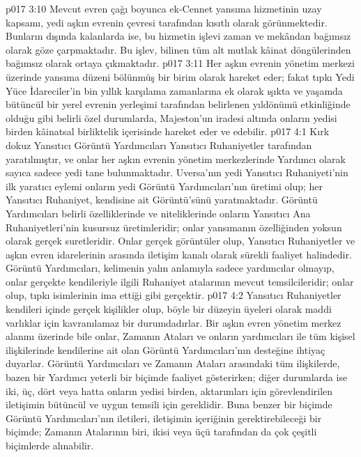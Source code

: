 \vs p017 3:10 Mevcut evren çağı boyunca ek\hyp{}Cennet yansıma hizmetinin uzay kapsamı, yedi aşkın evrenin çevresi tarafından kısıtlı olarak görünmektedir. Bunların dışında kalanlarda ise, bu hizmetin işlevi zaman ve mekândan bağımsız olarak göze çarpmaktadır. Bu işlev, bilinen tüm alt mutlak kâinat döngülerinden bağımsız olarak ortaya çıkmaktadır.
\vs p017 3:11 Her aşkın evrenin yönetim merkezi üzerinde yansıma düzeni bölünmüş bir birim olarak hareket eder; fakat tıpkı Yedi Yüce İdareciler’in bin yıllık karşılama zamanlarına ek olarak ışıkta ve yaşamda bütüncül bir yerel evrenin yerleşimi tarafından belirlenen yıldönümü etkinliğinde olduğu gibi belirli özel durumlarda, Majeston’un iradesi altında onların yedisi birden kâinatsal birliktelik içerisinde hareket eder ve edebilir.
\vs p017 4:1 Kırk dokuz Yansıtıcı Görüntü Yardımcıları Yansıtıcı Ruhaniyetler tarafından yaratılmıştır, ve onlar her aşkın evrenin yönetim merkezlerinde Yardımcı olarak sayıca sadece yedi tane bulunmaktadır. Uversa’nın yedi Yansıtıcı Ruhaniyeti’nin ilk yaratıcı eylemi onların yedi Görüntü Yardımcıları’nın üretimi olup; her Yansıtıcı Ruhaniyet, kendisine ait Görüntü’sünü yaratmaktadır. Görüntü Yardımcıları belirli özelliklerinde ve niteliklerinde onların Yansıtıcı Ana Ruhaniyetleri’nin kusursuz üretimleridir; onlar yansımanın özelliğinden yoksun olarak gerçek suretleridir. Onlar gerçek görüntüler olup, Yansıtıcı Ruhaniyetler ve aşkın evren idarelerinin arasında iletişim kanalı olarak sürekli faaliyet halindedir. Görüntü Yardımcıları, kelimenin yalın anlamıyla sadece yardımcılar olmayıp, onlar gerçekte kendileriyle ilgili Ruhaniyet atalarının mevcut temsilcileridir; onlar  olup, tıpkı isimlerinin ima ettiği gibi gerçektir.
\vs p017 4:2 Yansıtıcı Ruhaniyetler kendileri içinde gerçek kişilikler olup, böyle bir düzeyin üyeleri olarak maddi varlıklar için kavranılamaz bir durumdadırlar. Bir aşkın evren yönetim merkez alanını üzerinde bile onlar, Zamanın Ataları ve onların yardımcıları ile tüm kişisel ilişkilerinde kendilerine ait olan Görüntü Yardımcıları’nın desteğine ihtiyaç duyarlar. Görüntü Yardımcıları ve Zamanın Ataları arasındaki tüm ilişkilerde, bazen bir Yardımcı yeterli bir biçimde faaliyet gösterirken; diğer durumlarda ise iki, üç, dört veya hatta onların yedisi birden, aktarımları için görevlendirilen iletişimin bütüncül ve uygun temsili için gereklidir. Buna benzer bir biçimde Görüntü Yardımcıları’nın iletileri, iletişimin içeriğinin gerektirebileceği bir biçimde; Zamanın Atalarının biri, ikisi veya üçü tarafından da çok çeşitli biçimlerde alınabilir.
